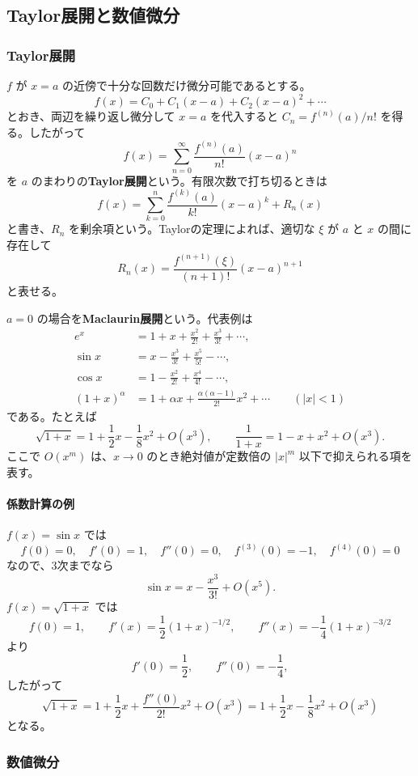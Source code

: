 \subsection{Taylor展開と数値微分}

\subsubsection{Taylor展開}

$f$ が $x=a$ の近傍で十分な回数だけ微分可能であるとする。
\[
 f(x)=C_0+C_1(x-a)+C_2(x-a)^2+\cdots
\]
とおき、両辺を繰り返し微分して $x=a$ を代入すると
$C_n=f^{(n)}(a)/n!$ を得る。したがって
\begin{equation}
 \boxed{f(x)=\sum_{n=0}^{\infty}
 \frac{f^{(n)}(a)}{n!}(x-a)^n}
\end{equation}
を $a$ のまわりの\textbf{Taylor展開}という。有限次数で打ち切るときは
\[
 f(x)=\sum_{k=0}^{n}\frac{f^{(k)}(a)}{k!}(x-a)^k+R_n(x)
\]
と書き、$R_n$ を剰余項という。Taylorの定理によれば、適切な
$\xi$ が $a$ と $x$ の間に存在して
\[
 R_n(x)=\frac{f^{(n+1)}(\xi)}{(n+1)!}(x-a)^{n+1}
\]
と表せる。

$a=0$ の場合を\textbf{Maclaurin展開}という。代表例は
\begin{align}
 e^x&=1+x+\frac{x^2}{2!}+\frac{x^3}{3!}+\cdots,\\
 \sin x&=x-\frac{x^3}{3!}+\frac{x^5}{5!}-\cdots,\\
 \cos x&=1-\frac{x^2}{2!}+\frac{x^4}{4!}-\cdots,\\
 (1+x)^\alpha
 &=1+\alpha x+\frac{\alpha(\alpha-1)}{2!}x^2+\cdots
 \qquad(|x|<1)
\end{align}
である。たとえば
\[
 \sqrt{1+x}=1+\frac12x-\frac18x^2+O(x^3),
\qquad
 \frac1{1+x}=1-x+x^2+O(x^3).
\]
ここで $O(x^m)$ は、$x\to0$ のとき絶対値が定数倍の $|x|^m$
以下で抑えられる項を表す。

\paragraph{係数計算の例}
$f(x)=\sin x$ では
\[
 f(0)=0,\quad f'(0)=1,\quad f''(0)=0,\quad
 f^{(3)}(0)=-1,\quad f^{(4)}(0)=0
\]
なので、3次までなら
\[
 \sin x=x-\frac{x^3}{3!}+O(x^5).
\]
$f(x)=\sqrt{1+x}$ では
\[
 f(0)=1,\qquad f'(x)=\frac12(1+x)^{-1/2},\qquad
 f''(x)=-\frac14(1+x)^{-3/2}
\]
より
\[
 f'(0)=\frac12,\qquad f''(0)=-\frac14,
\]
したがって
\[
 \sqrt{1+x}
 =1+\frac12x+\frac{f''(0)}{2!}x^2+O(x^3)
 =1+\frac12x-\frac18x^2+O(x^3)
\]
となる。

\subsubsection{数値微分}

